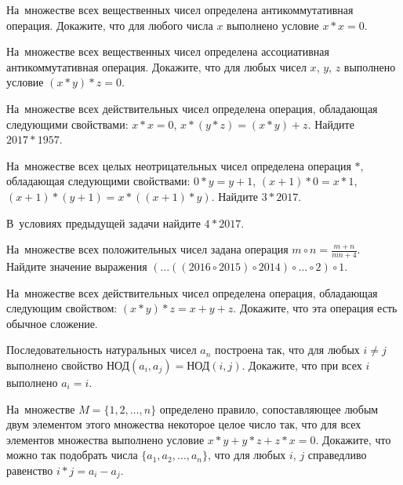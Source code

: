 \begin{problems}

\item
На~множестве всех вещественных чисел определена антикоммутативная операция.
Докажите, что для любого числа $x$ выполнено условие $x \ast x = 0$.

\item
На~множестве всех вещественных чисел определена ассоциативная антикоммутативная
операция.
Докажите, что для любых чисел $x$, $y$, $z$ выполнено условие
$(x \ast y) \ast z = 0$.

\item
На~множестве всех действительных чисел определена операция, обладающая
следующими свойствами: $x \ast x = 0$, $x \ast (y \ast z) =  (x \ast y) + z$.
Найдите $2017 \ast 1957$.

\item
На~множестве всех целых неотрицательных чисел определена операция $\ast$,
обладающая следующими свойствами:
$0 \ast y = y + 1$,
$(x + 1) \ast 0 = x \ast 1$,
$(x + 1) \ast (y + 1) = x \ast ((x + 1) \ast y)$.
Найдите $3 \ast 2017$.

\item
В~условиях предыдущей задачи найдите $4 \ast 2017$.

\item
На~множестве всех положительных чисел задана операция
$m \circ n = \frac{m + n}{m n + 4}$.
Найдите значение выражения
$(\ldots((2016 \circ 2015) \circ 2014) \circ \ldots \circ 2) \circ 1$.

\item
На~множестве всех действительных чисел определена операция, обладающая
следующим свойством: $(x \ast y) \ast z = x + y + z$.
Докажите, что эта операция есть обычное сложение.

\item
Последовательность натуральных чисел $a_{n}$ построена так, что для любых
$i \neq j$ выполнено свойство $\text{НОД}(a_i, a_j) = \text{НОД}(i, j)$.
Докажите, что при всех $i$ выполнено $a_i = i$.

\item
На~множестве $M = \{ 1, 2, \ldots, n\}$ определено правило, сопоставляющее
любым двум элементом этого множества некоторое целое число так, что для всех
элементов множества выполнено условие $x \ast y + y \ast z + z \ast x = 0$.
Докажите, что можно так подобрать числа $\{ a_{1}, a_{2}, \ldots, a_{n}\}$,
что для любых $i$, $j$ справедливо равенство $i \ast j = a_{i} - a_{j}$.

\end{problems}

